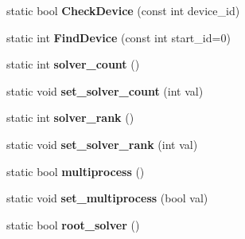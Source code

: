 \begin{DoxyCompactItemize}
\item 
static bool {\bfseries Check\+Device} (const int device\+\_\+id)\hypertarget{classcaffe_1_1Caffe_ae910c49602d48889673dd614d2aea014}{}\label{classcaffe_1_1Caffe_ae910c49602d48889673dd614d2aea014}

\item 
static int {\bfseries Find\+Device} (const int start\+\_\+id=0)\hypertarget{classcaffe_1_1Caffe_a7ef45036fc831ca416fd1695fc749ea3}{}\label{classcaffe_1_1Caffe_a7ef45036fc831ca416fd1695fc749ea3}

\item 
static int {\bfseries solver\+\_\+count} ()\hypertarget{classcaffe_1_1Caffe_a69e125ae1d6bfa3618fa4d0418d97468}{}\label{classcaffe_1_1Caffe_a69e125ae1d6bfa3618fa4d0418d97468}

\item 
static void {\bfseries set\+\_\+solver\+\_\+count} (int val)\hypertarget{classcaffe_1_1Caffe_ae66753e0dd783b50bbc61c40c89a43f3}{}\label{classcaffe_1_1Caffe_ae66753e0dd783b50bbc61c40c89a43f3}

\item 
static int {\bfseries solver\+\_\+rank} ()\hypertarget{classcaffe_1_1Caffe_abdd6522457e7ac94463d26408620f4c9}{}\label{classcaffe_1_1Caffe_abdd6522457e7ac94463d26408620f4c9}

\item 
static void {\bfseries set\+\_\+solver\+\_\+rank} (int val)\hypertarget{classcaffe_1_1Caffe_a2ec5a171e837fc106e7d1987e3c9a45d}{}\label{classcaffe_1_1Caffe_a2ec5a171e837fc106e7d1987e3c9a45d}

\item 
static bool {\bfseries multiprocess} ()\hypertarget{classcaffe_1_1Caffe_a181e979bf7f7f2fe4a6c5fbbc4d703ac}{}\label{classcaffe_1_1Caffe_a181e979bf7f7f2fe4a6c5fbbc4d703ac}

\item 
static void {\bfseries set\+\_\+multiprocess} (bool val)\hypertarget{classcaffe_1_1Caffe_aea8888baaabfc41014eba175a2538b7b}{}\label{classcaffe_1_1Caffe_aea8888baaabfc41014eba175a2538b7b}

\item 
static bool {\bfseries root\+\_\+solver} ()\hypertarget{classcaffe_1_1Caffe_a87775a1589a6e1b6e53d9bdbb013b8d8}{}\label{classcaffe_1_1Caffe_a87775a1589a6e1b6e53d9bdbb013b8d8}

\end{DoxyCompactItemize}
